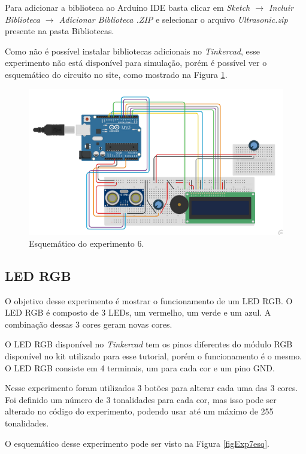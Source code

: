 \documentclass[12pt]{article}
\begin{document}
Para adicionar a biblioteca ao Arduino IDE basta clicar em \textit{Sketch $\rightarrow$ Incluir Biblioteca $\rightarrow$ Adicionar Biblioteca .ZIP} e selecionar o arquivo \textit{Ultrasonic.zip} presente na pasta Bibliotecas.

Como não é possível instalar bibliotecas adicionais no \textit{Tinkercad}, esse experimento não está disponível para simulação, porém é possível ver o esquemático do circuito no site, como mostrado na Figura \ref{figExp6esq}.

\begin{figure}[H]
	\centering
	\includegraphics[scale=0.6]{Imagens/Experimentos/6-SensorDistancia/esquematico.png}
	\caption{Esquemático do experimento 6.}
	\label{figExp6esq}
\end{figure}

\subsection{LED RGB}
O objetivo desse experimento é mostrar o funcionamento de um LED RGB. O LED RGB é composto de 3 LEDs, um vermelho, um verde e um azul. A combinação dessas 3 cores geram novas cores.

O LED RGB disponível no \textit{Tinkercad} tem os pinos diferentes do módulo RGB disponível no kit utilizado para esse tutorial, porém o funcionamento é o mesmo. O LED RGB consiste em 4 terminais, um para cada cor e um pino GND.

Nesse experimento foram utilizados 3 botões para alterar cada uma das 3 cores. Foi definido um número de 3 tonalidades para cada cor, mas isso pode ser alterado no código do experimento, podendo usar até um máximo de 255 tonalidades.

O esquemático desse experimento pode ser visto na Figura \ref{figExp7esq}.
\end{document}

